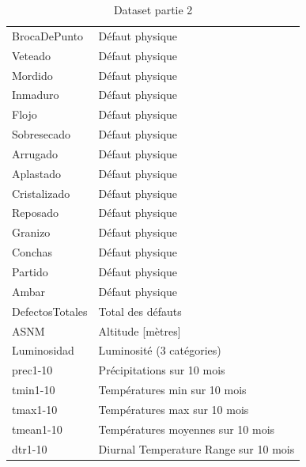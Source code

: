 \begin{table}[H]
\centering
\caption{Dataset partie 2}
\label{my-label}
\begin{tabular}{ll}
		BrocaDePunto    & Défaut physique                                    \\
		Veteado         & Défaut physique                                    \\
		Mordido         & Défaut physique                                    \\
		Inmaduro        & Défaut physique                                    \\
		Flojo           & Défaut physique                                    \\
		Sobresecado     & Défaut physique                                    \\
		Arrugado        & Défaut physique                                    \\
		Aplastado       & Défaut physique                                    \\
		Cristalizado    & Défaut physique                                    \\
		Reposado        & Défaut physique                                    \\
		Granizo         & Défaut physique                                    \\
		Conchas         & Défaut physique                                    \\
		Partido         & Défaut physique                                    \\
		Ambar           & Défaut physique                                    \\
		DefectosTotales & Total des défauts                                  \\
		ASNM            & Altitude  {[}mètres{]}                             \\
		Luminosidad     & Luminosité (3 catégories)                          \\
		prec1-10        & Précipitations sur 10 mois                         \\
		tmin1-10        & Températures min sur 10 mois                       \\
		tmax1-10        & Températures max sur 10 mois                       \\
		tmean1-10       & Températures moyennes sur 10 mois                  \\
		dtr1-10         & Diurnal Temperature Range sur 10 mois              \\

\end{tabular}
\end{table}
